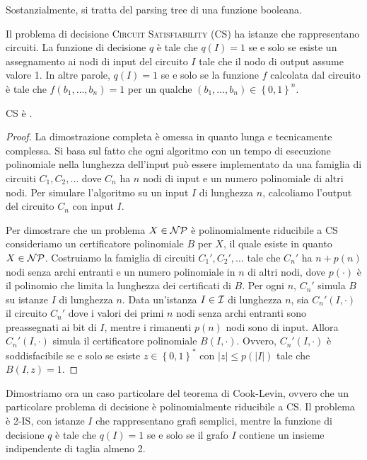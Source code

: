 Sostanzialmente, si tratta del parsing tree di una funzione booleana.

Il problema di decisione \textsc{Circuit Satisfiability} (CS) ha istanze che rappresentano circuiti. La funzione di decisione $q$ è tale che $q(I) = 1$ se e solo se esiste un assegnamento ai nodi di input del circuito $I$ tale che il nodo di output assume valore 1. In altre parole, $q(I) = 1$ se e solo se la funzione $f$ calcolata dal circuito è tale che $f\left(b_1, \dots, b_n\right) = 1$ per un qualche $\left(b_1, \dots, b_n\right) \in \left\{0,1\right\}^n$. \\

\begin{theorem}
    CS è \NPc.
\end{theorem}
\begin{proof}
    La dimostrazione completa è omessa in quanto lunga e tecnicamente complessa. Si basa sul fatto che ogni algoritmo con un tempo di esecuzione polinomiale nella lunghezza dell'input può essere implementato da una famiglia di circuiti $C_1, C_2, \dots$ dove $C_n$ ha $n$ nodi di input e un numero polinomiale di altri nodi. Per simulare l'algoritmo su un input $I$ di lunghezza $n$, calcoliamo l'output del circuito $C_n$ con input $I$.

    Per dimostrare che un problema $X \in \mathcal{NP}$ è polinomialmente riducibile a CS consideriamo un certificatore polinomiale $B$ per $X$, il quale esiste in quanto $X \in \mathcal{NP}$. Costruiamo la famiglia di circuiti $C_1', C_2', \dots$ tale che $C_n'$ ha $n + p(n)$ nodi senza archi entranti e un numero polinomiale in $n$ di altri nodi, dove $p(\cdot)$ è il polinomio che limita la lunghezza dei certificati di $B$. Per ogni $n$, $C_n'$ simula $B$ su istanze $I$ di lunghezza $n$. Data un'istanza $I \in \mathcal{I}$ di lunghezza $n$, sia $C_n' (I, \cdot)$ il circuito $C_n'$ dove i valori dei primi $n$ nodi senza archi entranti sono preassegnati ai bit di $I$, mentre i rimanenti $p(n)$ nodi sono di input. Allora $C_n'(I, \cdot)$ simula il certificatore polinomiale $B(I, \cdot)$. Ovvero, $C_n'(I, \cdot)$ è soddisfacibile se e solo se esiste $z \in \left\{0,1\right\}^\ast$ con $|z| \leq p(|I|)$ tale che $B(I, z) = 1$.
\end{proof}

Dimostriamo ora un caso particolare del teorema di Cook-Levin, ovvero che un particolare problema di decisione è polinomialmente riducibile a CS. Il problema è 2-IS, con istanze $I$ che rappresentano grafi semplici, mentre la funzione di decisione $q$ è tale che $q(I) = 1$ se e solo se il grafo $I$ contiene un insieme indipendente di taglia almeno 2. \\

